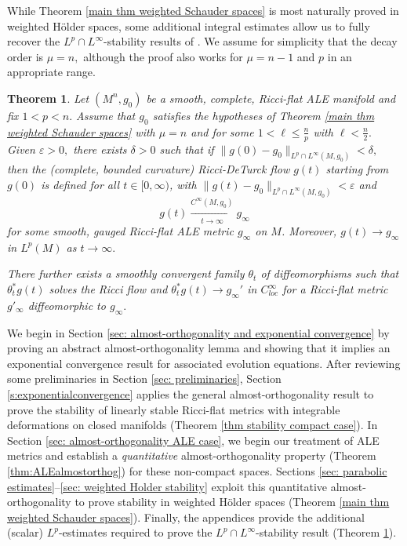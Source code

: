 \documentclass[12pt]{amsart}
\renewcommand{\1}{{\mathbf 1}}
\newcommand{\eps}{{\varepsilon}}
\newtheorem{thm}{Theorem}[section]
\theoremstyle{others}
\numberwithin{equation}{section}
\begin{document}
While Theorem \ref{main thm weighted Schauder spaces} is most naturally proved in weighted H{\"o}lder spaces, some additional integral estimates allow us to fully recover the $L^p \cap L^\infty$-stability results of \cite{DeruelleKroncke20, KronckePetersen20}. We assume for simplicity that the decay order is $\mu = n,$ although the proof also works for $\mu = n - 1$ and $p$ in an appropriate range. %
\begin{thm} \label{main thm L^p spaces}
    Let $(M^n, g_0)$ be a smooth, complete, Ricci-flat ALE manifold and fix $1 < p < n.$
    Assume that $g_0$ {satisfies the hypotheses of Theorem \ref{main thm weighted Schauder spaces} %
    with $\mu = n$ and for some $1 < \ell \leq \frac{n}{p}$ with $\ell < \frac{n}{2}.$}
     Given $\eps > 0,$ there exists $\delta > 0$ such that if $\|g(0) - g_0 \|_{L^p\cap L^\infty(M, g_0)} < \delta,$ %
    then the (complete, bounded curvature) Ricci-DeTurck flow $g(t)$ starting from $g(0)$ is defined for all $t \in [0, \infty)$, with $\|g(t) - g_0 \|_{L^p \cap L^\infty(M, g_0) } < \eps$ and 
        $$g(t) \xrightarrow[t\to \infty]{C^\infty(M, g_0)} g_\infty$$
    for some smooth, gauged Ricci-flat ALE metric $g_\infty$ on $M$. Moreover, $g(t) \to g_\infty$ in $L^p(M)$ as $t \to \infty.$

There further exists a smoothly convergent family $\theta_t$ of diffeomorphisms such that $\theta_t^* g(t)$ solves the Ricci flow and $\theta_t^*g(t) \to g_{\infty}'$ in $C^\infty_{loc}$ for a Ricci-flat metric $g'_\infty$ diffeomorphic to $g_\infty.$
\end{thm}

We begin in Section \ref{sec: almost-orthogonality and exponential convergence} by proving an abstract almost-orthogonality lemma and showing that it implies an exponential convergence result for associated evolution equations.
After reviewing some preliminaries in Section \ref{sec: preliminaries}, Section \ref{s:exponentialconvergence} applies the general almost-orthogonality result to prove the stability of linearly stable Ricci-flat metrics with integrable deformations on closed manifolds (Theorem \ref{thm stability compact case}).
In Section \ref{sec: almost-orthogonality ALE case}, we begin our treatment of ALE metrics and establish a \emph{quantitative} almost-orthogonality property (Theorem \ref{thm:ALEalmostorthog}) for these non-compact spaces.
Sections \ref{sec: parabolic estimates}--\ref{sec: weighted Holder stability} exploit this quantitative almost-orthogonality to prove stability in weighted H{\"o}lder spaces (Theorem \ref{main thm weighted Schauder spaces}).
Finally, %
the appendices provide the additional (scalar) $L^p$-estimates required to prove the $L^p \cap L^\infty$-stability result (Theorem \ref{main thm L^p spaces}).
\end{document}
